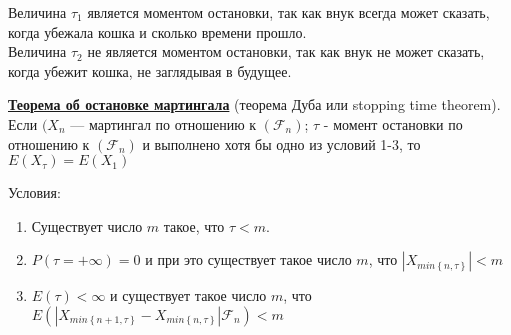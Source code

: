 \documentclass[a4paper]{article}
\begin{document}
Величина $\tau_{1}$ является моментом остановки, так как внук всегда может сказать, когда убежала кошка и сколько времени прошло. \\
Величина $\tau_{2}$ не является моментом остановки, так как внук не может сказать, когда убежит кошка, не заглядывая в будущее. \\
\par{\bf\underline{Теорема об остановке мартингала}} (теорема Дуба или stopping time theorem). Если $(X_{n}$ — мартингал по отношению к $(\mathcal{F}_{n})$; $\tau$ - момент остановки по отношению к $(\mathcal{F}_{n})$ и выполнено хотя бы одно из условий 1-3, то $E(X_{\tau})=E(X_{1})$
\par{Условия:}
\begin{enumerate}
	\item Существует число $m$ такое, что $\tau < m$.
	\item $P(\tau = +\infty) =0$ и при это существует такое число $m$, что $|X_{min\left\lbrace n,\tau \right\rbrace }|<m$
	\item $E(\tau)<\infty$ и существует такое число $m$, что $E(|X_{min\left\lbrace n+1,\tau \right\rbrace } - X_{min\left\lbrace n,\tau \right\rbrace }|\mathcal{F}_{n})<m$
\end{enumerate}
\end{document}
